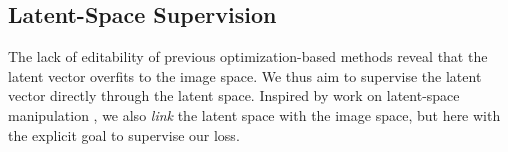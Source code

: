     







\subsection{Latent-Space Supervision}

The lack of editability of previous optimization-based methods reveal that the latent vector overfits to the image space. We thus aim to supervise the latent vector directly through the latent space. Inspired by work on latent-space manipulation , we also \emph{link} the latent space with the image space, but here with the explicit goal to supervise our loss. 

